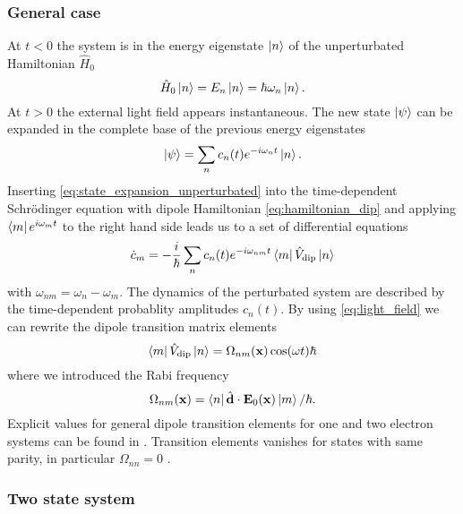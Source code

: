 \subsubsection{General case}

At $t<0$ the system is in the energy eigenstate $\ket{n}$ of the
unperturbated Hamiltonian $\hat{H}_0$
\begin{equation}
  \hat{H}_0\ket{n}
  =E_n\ket{n}
  =\hbar\omega_n\ket{n}
  \label{eq:eigenvalue_energy_unperturbated}.
\end{equation}
At $t>0$ the external light field appears instantaneous. The new state
$\ket{\psi}$ can be expanded in the complete base of the previous energy
eigenstates
\begin{equation}
  \ket{\psi}
  =\sum_nc_n(t)e^{-i\omega_nt}\ket{n}
  \label{eq:state_expansion_unperturbated}.
\end{equation}
Inserting \cref{eq:state_expansion_unperturbated} into the time-dependent
Schrödinger equation with dipole Hamiltonian \cref{eq:hamiltonian_dip} and
applying $\bra{m}e^{i\omega_mt}$ to the right hand side leads us to a set
of differential equations
\begin{equation}
  \dot{c}_m
  =-\frac{i}{\hbar}\sum_nc_n(t)e^{-i\omega_{nm}t}\bra{m}\hat{V}_\text{dip}\ket{n}
  \label{eq:differential_equation_population_dynamics}
\end{equation}
with $\omega_{nm}=\omega_n-\omega_m$. The dynamics of the perturbated system
are described by the time-dependent probablity amplitudes $c_n(t)$.
By using \cref{eq:light_field} we can rewrite the dipole transition matrix
elements
\begin{equation}
  \bra{m}\hat{V}_\text{dip}\ket{n}
  =\Omega_{nm}(\vb{x})\cos(\omega t)\hbar
  \label{eq:elements_dipole_transition_matrix}
\end{equation}
where we introduced the Rabi frequency
\begin{equation}
  \Omega_{nm}(\vb{x})
  =\bra{n}\hat{\vb{d}}\cdot\vb{E}_0(\vb{x})\ket{m}/\hbar
  \label{eq:rabi_frequency}.
\end{equation}
Explicit values for general dipole transition elements for one and two
electron systems can be found in \cite{Bethe1957}. Transition elements
vanishes for states with same parity, in particular $\Omega_{nn}=0$
\cite{Bartelmann2018}.

\subsubsection{Two state system}

